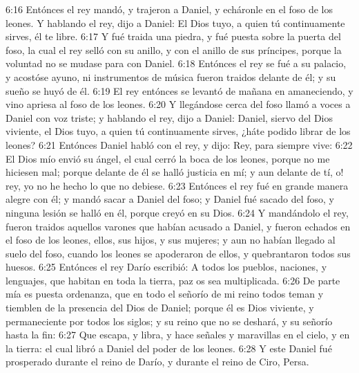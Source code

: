 6:16 Entónces el rey mandó, y trajeron a Daniel, y echáronle en el foso de los leones. Y hablando el rey, dijo a Daniel: El Dios tuyo, a quien tú continuamente sirves, él te libre.
6:17 Y fué traida una piedra, y fué puesta sobre la puerta del foso, la cual el rey selló con su anillo, y con el anillo de sus príncipes, porque la voluntad no se mudase para con Daniel.
6:18 Entónces el rey se fué a su palacio, y acostóse ayuno, ni instrumentos de música fueron traidos delante de él; y su sueño se huyó de él.
6:19 El rey entónces se levantó de mañana en amaneciendo, y vino apriesa al foso de los leones.
6:20 Y llegándose cerca del foso llamó a voces a Daniel con voz triste; y hablando el rey, dijo a Daniel: Daniel, siervo del Dios viviente, el Dios tuyo, a quien tú continuamente sirves, ¿háte podido librar de los leones?
6:21 Entónces Daniel habló con el rey, y dijo: Rey, para siempre vive:
6:22 El Dios mío envió su ángel, el cual cerró la boca de los leones, porque no me hiciesen mal; porque delante de él se halló justicia en mí; y aun delante de tí, o! rey, yo no he hecho lo que no debiese.
6:23 Entónces el rey fué en grande manera alegre con él; y mandó sacar a Daniel del foso; y Daniel fué sacado del foso, y ninguna lesión se halló en él, porque creyó en su Dios.
6:24 Y mandándolo el rey, fueron traidos aquellos varones que habían acusado a Daniel, y fueron echados en el foso de los leones, ellos, sus hijos, y sus mujeres; y aun no habían llegado al suelo del foso, cuando los leones se apoderaron de ellos, y quebrantaron todos sus huesos.
6:25 Entónces el rey Darío escribió: A todos los pueblos, naciones, y lenguajes, que habitan en toda la tierra, paz os sea multiplicada.
6:26 De parte mía es puesta ordenanza, que en todo el señorío de mi reino todos teman y tiemblen de la presencia del Dios de Daniel; porque él es Dios viviente, y permaneciente por todos los siglos; y su reino que no se deshará, y su señorío hasta la fin:
6:27 Que escapa, y libra, y hace señales y maravillas en el cielo, y en la tierra: el cual libró a Daniel del poder de los leones.
6:28 Y este Daniel fué prosperado durante el reino de Darío, y durante el reino de Ciro, Persa.

